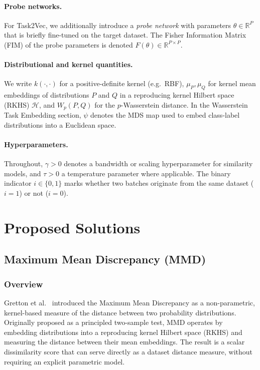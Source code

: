\documentclass[peerreview]{IEEEtran}
\begin{document}
\paragraph{Probe networks.}
For Task2Vec, we additionally introduce a \emph{probe network} with
parameters $\theta \in \mathbb{R}^{P}$ that is briefly fine-tuned on
the target dataset. The Fisher Information Matrix (FIM) of the probe
parameters is denoted $F(\theta) \in \mathbb{R}^{P \times P}$.

\paragraph{Distributional and kernel quantities.}
We write $k(\cdot, \cdot)$ for a positive-definite kernel (e.g.~RBF),
$\mu_P, \mu_Q$ for kernel mean embeddings of distributions $P$ and $Q$
in a reproducing kernel Hilbert space (RKHS) $\mathcal{H}$, and
$W_p(P, Q)$ for the $p$-Wasserstein distance. In the Wasserstein Task
Embedding section, $\psi$ denotes the MDS map used to embed
class-label distributions into a Euclidean space.

\paragraph{Hyperparameters.}
Throughout, $\gamma > 0$ denotes a bandwidth or scaling
hyperparameter for similarity models, and $\tau > 0$ a temperature
parameter where applicable. The binary indicator $i \in \{0, 1\}$
marks whether two batches originate from the same dataset ($i = 1$)
or not ($i = 0$).

\section{Proposed Solutions}

\subsection{Maximum Mean Discrepancy (MMD)}

\subsubsection*{Overview}
Gretton et al.~\cite{gretton2012kernel} introduced the Maximum Mean
Discrepancy as a non-parametric, kernel-based measure of the distance
between two probability distributions. Originally proposed as a
principled two-sample test, MMD operates by embedding distributions
into a reproducing kernel Hilbert space (RKHS) and measuring the
distance between their mean embeddings. The result is a scalar
dissimilarity score that can serve directly as a dataset distance
measure, without requiring an explicit parametric model.
\end{document}
